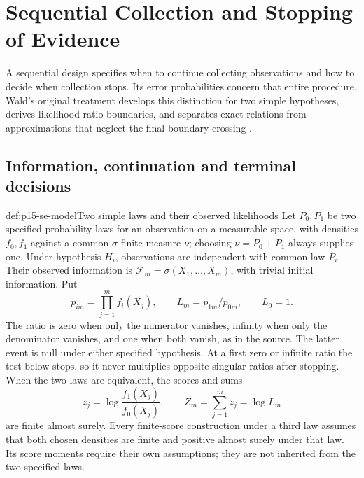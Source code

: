 \chapter{Sequential Collection and Stopping of Evidence}
\label{sec:p15-sequential-evidence}

A sequential design specifies when to continue collecting observations
and how to decide when collection stops. Its error probabilities concern
that entire procedure. Wald's original treatment develops this distinction
for two simple hypotheses, derives likelihood-ratio boundaries, and
separates exact relations from approximations that neglect the final
boundary crossing \cite[Part I, Sections 2--4]{Wald1945SequentialTests}.

\section{Information, continuation and terminal decisions}
\label{sec:p15-se-information}

\begin{hbdefinition}{def:p15-se-model}{Two simple laws and their observed likelihoods}
Let \(P_0,P_1\) be two specified probability laws for an observation
on a measurable space, with densities \(f_0,f_1\) against a common
\(\sigma\)-finite measure \(\nu\); choosing \(\nu=P_0+P_1\)
always supplies one. Under hypothesis \(H_i\), observations are independent
with common law \(P_i\). Their observed information is
\(\mathcal F_m=\sigma(X_1,\ldots,X_m)\), with trivial initial
information. Put
\[
 p_{im}=\prod_{j=1}^mf_i(X_j),\qquad L_m=p_{1m}/p_{0m},\qquad L_0=1.
\]
The ratio is zero when only the numerator vanishes, infinity when only
the denominator vanishes, and one when both vanish, as in the source.
The latter event is null under either specified hypothesis. At a first
zero or infinite ratio the test below stops, so it never multiplies
opposite singular ratios after stopping. When the two laws are equivalent,
the scores and sums
\[
 z_j=\log\frac{f_1(X_j)}{f_0(X_j)},\qquad Z_m=\sum_{j=1}^m z_j=\log L_m
\]
are finite almost surely. Every finite-score construction under a third
law assumes that both chosen densities are finite and positive almost
surely under that law. Its score moments require their own assumptions;
they are not inherited from the two specified laws.
\end{hbdefinition}

